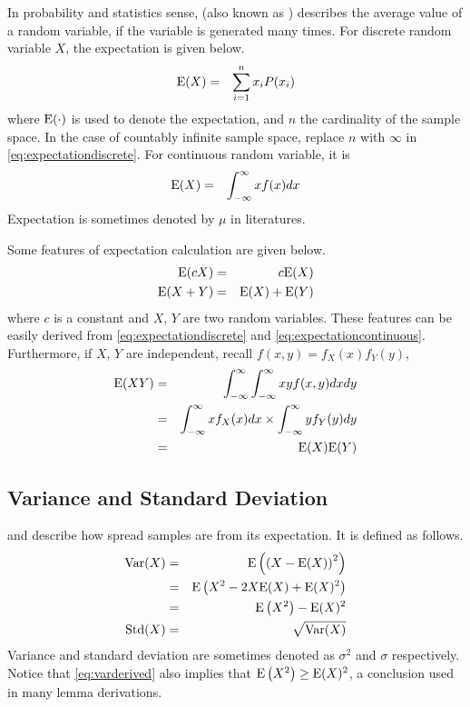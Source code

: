 In probability and statistics sense,  (also known as ) describes the average value of a random variable, if the variable is generated many times. For discrete random variable $X$, the expectation is given below.
\begin{eqnarray}
	\textup{E}(X) &=& \sum_{i=1}^{n}x_iP(x_i) \label{eq:expectationdiscrete}
\end{eqnarray}
where $\textup{E}(\cdot)$ is used to denote the expectation, and $n$ the cardinality of the sample space. In the case of countably infinite sample space, replace $n$ with $\infty$ in \eqref{eq:expectationdiscrete}. For continuous random variable, it is
\begin{eqnarray}
	\textup{E}(X) &=& \int_{-\infty}^{\infty}xf(x)dx \label{eq:expectationcontinuous}
\end{eqnarray}
Expectation is sometimes denoted by $\mu$ in literatures.

Some features of expectation calculation are given below.
\begin{eqnarray}
	\textup{E}(cX) &=& c\textup{E}(X) \nonumber \\
	\textup{E}(X+Y) &=& \textup{E}(X) + \textup{E}(Y) \nonumber
\end{eqnarray}
where $c$ is a constant and $X$, $Y$ are two random variables. These features can be easily derived from \eqref{eq:expectationdiscrete} and \eqref{eq:expectationcontinuous}. Furthermore, if $X$, $Y$ are independent, recall $f(x,y) = f_X(x)f_Y(y)$,
\begin{eqnarray}
	\textup{E}(XY) &=& \int_{-\infty}^{\infty}\int_{-\infty}^{\infty} xyf(x, y)dxdy \nonumber \\
	&=& \int_{-\infty}^{\infty}xf_X(x)dx \times \int_{-\infty}^{\infty}yf_Y(y)dy \nonumber \\
	&=& \textup{E}(X)\textup{E}(Y) \nonumber
\end{eqnarray}

\subsection{Variance and Standard Deviation}

 and  describe how spread samples are from its expectation. It is defined as follows.
\begin{eqnarray}
	\textup{Var}(X) &=& \textup{E}\left(\left(X-\textup{E}(X)\right)^2\right) \label{eq:vardef} \\
	&=& \textup{E}\left(X^2-2X\textup{E}(X)+\textup{E}(X)^2\right) \nonumber \\
	&=& \textup{E}\left(X^2\right)-\textup{E}(X)^2 \label{eq:varderived} \\
	\textup{Std}(X) &=& \sqrt{\textup{Var}(X)} \nonumber
\end{eqnarray}
Variance and standard deviation are sometimes denoted as $\sigma^2$ and $\sigma$ respectively. Notice that \eqref{eq:varderived} also implies that $\textup{E}\left(X^2\right) \geq \textup{E}(X)^2$, a conclusion used in many lemma derivations.

